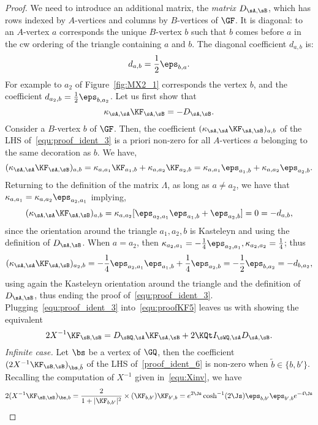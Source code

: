 \documentclass[a4paper,twoside,11pt]{article}
\begin{document}
\begin{proof}
We need to introduce an additional matrix, the \emph{matrix $D_{\sA,\sB}$}, which has rows indexed by $A$-vertices and columns by $B$-vertices of $\GF$. It is diagonal:
to an $A$-vertex $a$ corresponds the unique $B$-vertex $b$ such that $b$ comes before $a$ in the cw ordering of the triangle
containing $a$ and $b$. The diagonal coefficient $d_{a,b}$ is:
\[
d_{a,b}=\frac{1}{2}\eps_{b,a}.
\]
For example to $a_2$ of Figure~\ref{fig:MX2_1} corresponds the vertex $b$, and the coefficient $d_{a_2,b}=\frac{1}{2}\eps_{b,a_2}$.
Let us first show that
\begin{equation} \label{equ:proof_ident_3}
\kappa_{\sA,\sA}\KF_{\sA,\sB}=-D_{\sA,\sB}.
\end{equation}
Consider a $B$-vertex $b$ of $\GF$. Then, the coefficient $(\kappa_{\sA,\sA}\KF_{\sA,\sB})_{a,b}$ of the LHS 
of~\eqref{equ:proof_ident_3} is a priori non-zero
for all $A$-vertices $a$ belonging to the same decoration as $b$. We have,
\[
(\kappa_{\sA,\sA}\KF_{\sA,\sB})_{a,b}=\kappa_{a,a_1}\KF_{a_1,b}+\kappa_{a,a_2}\KF_{a_2,b}=
\kappa_{a,a_1}\eps_{a_1,b}+\kappa_{a,a_2}\eps_{a_2,b}.
\]
Returning to the definition of the matrix $\Lambda$, as long as $a\neq a_2$, we have that
$\kappa_{a,a_1}=\kappa_{a,a_2}\eps_{a_2,a_1}$ implying,
\[
(\kappa_{\sA,\sA}\KF_{\sA,\sB})_{a,b}=
\kappa_{a,a_2}[\eps_{a_2,a_1}\eps_{a_1,b}+\eps_{a_2,b}]=0=-d_{a,b},
\]
since the orientation around the triangle $a_1,a_2,b$ is Kasteleyn and using the definition of $D_{\sA,\sB}$. 
When $a=a_2$, then $\kappa_{a_2,a_1}=-\frac{1}{4}\eps_{a_2,a_1},
\kappa_{a_2,a_2}=\frac{1}{4}$; thus
\[
(\kappa_{\sA,\sA}\KF_{\sA,\sB})_{a_2,b}=-\frac{1}{4}\eps_{a_2,a_1}\eps_{a_1,b}+\frac{1}{4}\eps_{a_2,b}=
-\frac{1}{2}\eps_{b,a_2}=-d_{b,a_2},
\]
using again the Kasteleyn orientation around the triangle and the definition of $D_{\sA,\sB}$, thus ending the proof of~\eqref{equ:proof_ident_3}.
Plugging~\eqref{equ:proof_ident_3} into~\eqref{equ:proofKF5} leaves us with showing the equivalent
\begin{equation}\label{proof_ident_6}
2X^{-1}\KF_{\sB,\sB}=D_{\sBQ,\sA}\KF_{\sA,\sB}+2 \KQt I_{\sWQ,\sA}D_{\sA,\sB}.
\end{equation}
\emph{Infinite case.} 
Let $\bs$ be a vertex of $\GQ$, then 
the coefficient $(2X^{-1}\KF_{\sB,\sB})_{\bs,\tilde{b}}$ of the LHS of~\eqref{proof_ident_6} is non-zero when 
$\tilde{b}\in\{b,b'\}$. 
Recalling the computation of $X^{-1}$ given in~\eqref{equ:Xinv}, we have
\begin{align*}
2(X^{-1}\KF_{\sB,\sB})_{\bs,b}&=\frac{2}{1+|\KF_{b,b'}|^2}\times(\KF_{b,b'})\KF_{b',b}=e^{2\Js}\cosh^{-1}(2\Js)\eps_{b,b'}\eps_{b',b}e^{-4\Js}\\

\end{align*}
\end{proof}
\end{document}
